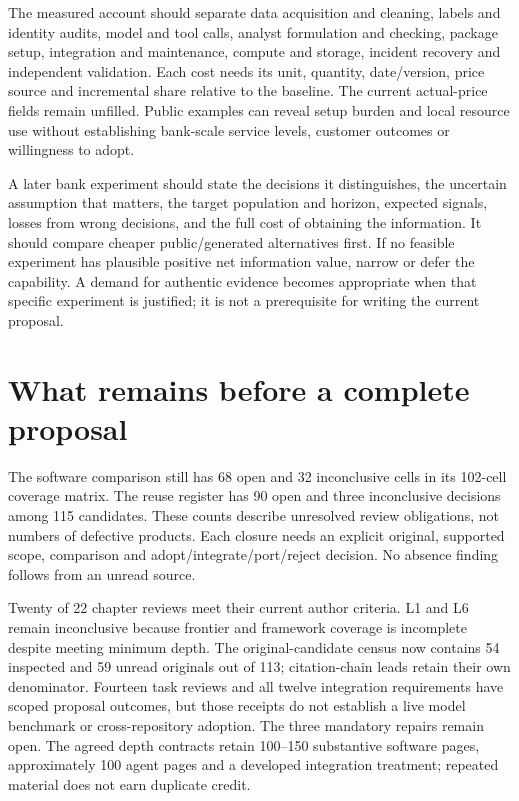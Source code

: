 The measured account should separate data acquisition and cleaning,
labels and identity audits, model and tool calls, analyst formulation
and checking, package setup, integration and maintenance, compute and
storage, incident recovery and independent validation. Each cost needs
its unit, quantity, date/version, price source and incremental share
relative to the baseline. The current actual-price fields remain
unfilled. Public examples can reveal setup burden and local resource use
without establishing bank-scale service levels, customer outcomes or
willingness to adopt. \citep{sp13_economics}

A later bank experiment should state the decisions it distinguishes, the
uncertain assumption that matters, the target population and horizon,
expected signals, losses from wrong decisions, and the full cost of
obtaining the information. It should compare cheaper public/generated
alternatives first. If no feasible experiment has plausible positive net
information value, narrow or defer the capability. A demand for
authentic evidence becomes appropriate when that specific experiment is
justified; it is not a prerequisite for writing the current proposal.

\hypertarget{what-remains-before-a-complete-proposal}{%
\section{What remains before a complete
proposal}\label{what-remains-before-a-complete-proposal}}

The software comparison still has 68 open and 32 inconclusive cells in
its 102-cell coverage matrix. The reuse register has 90 open and three
inconclusive decisions among 115 candidates. These counts describe
unresolved review obligations, not numbers of defective products. Each
closure needs an explicit original, supported scope, comparison and
adopt/integrate/port/reject decision. No absence finding follows from an
unread source.
\citep{sp20hy_progress,sp20je_progress,sp20nc_progress,sp20gc_progress,sp20ea_progress,sp20vm_progress,sp20pye_progress,sp20fx_progress,sp20pa_progress,sp20rfx_progress}

Twenty of 22 chapter reviews meet their current author criteria. L1 and
L6 remain inconclusive because frontier and framework coverage is
incomplete despite meeting minimum depth. The original-candidate census
now contains 54 inspected and 59 unread originals out of 113;
citation-chain leads retain their own denominator. Fourteen task reviews
and all twelve integration requirements have scoped proposal outcomes,
but those receipts do not establish a live model benchmark or
cross-repository adoption. The three mandatory repairs remain open. The
agreed depth contracts retain 100--150 substantive software pages,
approximately 100 agent pages and a developed integration treatment;
repeated material does not earn duplicate credit.
\citep{sp20hy_progress,sp19ec_census,sp18ar_census,sp18f_census,sp13_scope}

